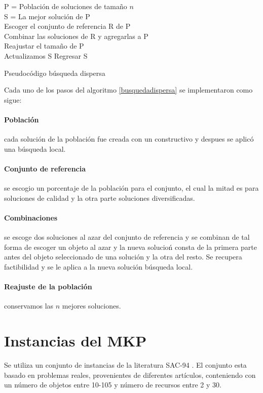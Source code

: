 \documentclass[12pt,a4paper,twocolumn]{article}
\begin{document}
\begin{algorithm}
P = Poblaci\'on de soluciones de tamaño $n$ \\
S = La mejor soluci\'on de P \\
{
	Escoger el conjunto de referencia R de P \\
	Combinar las soluciones de R y agregarlas a P \\
	Reajustar el tamaño de P \\
	Actualizamos S
}
Regresar S
\caption{Pseudocódigo b\'usqueda dispersa}
\label{busquedadispersa}
\end{algorithm}

Cada uno de los pasos del algoritmo \ref{busquedadispersa} se implementaron como sigue:
\paragraph{Poblaci\'on} cada soluci\'on de la poblaci\'on fue creada con un constructivo y despues se aplic\'o una b\'usqueda local.
\paragraph{Conjunto de referencia} se escogio un porcentaje de la poblaci\'on para el conjunto, el cual la mitad es para soluciones de calidad y la otra parte soluciones diversificadas.
\paragraph{Combinaciones} se escoge dos soluciones al azar del conjunto de referencia y se combinan de tal forma de escoger un objeto al azar y la nueva solucio\'n consta de la primera parte antes del objeto seleccionado de una soluci\'on y la otra del resto. Se recupera factibilidad y se le aplica a la nueva soluci\'on b\'usqueda local.
\paragraph{Reajuste de la poblaci\'on} conservamos las $n$ mejores soluciones.

\section{Instancias del MKP}

Se utiliza un conjunto de instancias de la literatura SAC-94 \cite{beasley}.
El conjunto esta basado en problemas reales, provenientes de diferentes artículos, conteniendo con un número de objetos entre 10-105 y n\'umero de recursos entre 2 y 30.
\end{document}
